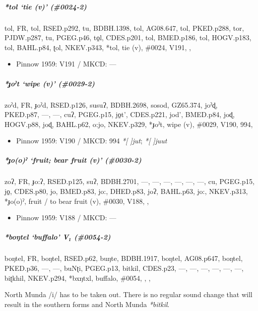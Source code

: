 \documentclass[a4paper,]{article}
\providecommand{\tightlist}{%
  \setlength{\itemsep}{0pt}\setlength{\parskip}{0pt}}
\let\oldsubparagraph\subparagraph
\renewcommand{\subparagraph}[1]{\oldsubparagraph{#1}\mbox{}}
\begin{document}
\subparagraph{\texorpdfstring{\emph{*tol} `tie (v)'
(\#0024-2)}{*tol tie (v) (\#0024-2)}}\label{tol-tie-v-0024-2}

tol, FR, tol, RSED.p292, tu, BDBH.1398, tol, AG08.647, tol, PKED.p288,
tor, PJDW.p287, tu, PGEG.p46, to̠l, CDES.p201, tol, BMED.p186, tol,
HOGV.p183, tol, BAHL.p84, ʈol, NKEV.p343, *tol, tie (v), \#0024, V191, ,

\begin{itemize}
\tightlist
\item
  Pinnow 1959: V191 / MKCD: ---
\end{itemize}

\subparagraph{\texorpdfstring{\emph{*ɟoˀt} `wipe (v)'
(\#0029-2)}{*ɟoˀt wipe (v) (\#0029-2)}}\label{ux25foux2c0t-wipe-v-0029-2}

zoˀd, FR, ɟoˀd, RSED.p126, susuʔ, BDBH.2698, sosod, GZ65.374, joˀɖ,
PKED.p87, ---, ---, cuʔ, PGEG.p15, jo̠t', CDES.p221, jod', BMED.p84, joɖ,
HOGV.p88, joɖ, BAHL.p62, o:jo, NKEV.p329, *ɟoˀt, wipe (v), \#0029, V190,
994,

\begin{itemize}
\tightlist
\item
  Pinnow 1959: V190 / MKCD: 994 \emph{*{[} {]}jut}; \emph{*{[} {]}juut}
\end{itemize}

\subparagraph{\texorpdfstring{\emph{*ɟo(o)ˀ} `fruit; bear fruit (v)'
(\#0030-2)}{*ɟo(o)ˀ fruit; bear fruit (v) (\#0030-2)}}\label{ux25fooux2c0-fruit-bear-fruit-v-0030-2}

zoʔ, FR, ɟo:ʔ, RSED.p125, suʔ, BDBH.2701, ---, ---, ---, ---, ---, ---,
cu, PGEG.p15, jo̠, CDES.p80, jo, BMED.p83, jo:, DHED.p83, joʔ, BAHL.p63,
jo:, NKEV.p313, *ɟo(o)ˀ, fruit / to bear fruit (v), \#0030, V188, ,

\begin{itemize}
\tightlist
\item
  Pinnow 1959: V188 / MKCD: ---
\end{itemize}

\subparagraph{\texorpdfstring{\emph{*boŋtel} `buffalo' V₁
(\#0054-2)}{*boŋtel buffalo V₁ (\#0054-2)}}\label{boux14btel-buffalo-v-0054-2}

boŋtel, FR, boŋtel, RSED.p62, buŋte, BDBH.1917, boŋtel, AG08.p647,
boŋtel, PKED.p36, ---, ---, buNʈi, PGEG.p13, bitkil, CDES.p23, ---, ---,
---, ---, ---, ---, biʈkhil, NKEV.p294, *bxŋtxl, buffalo, \#0054, , ,

North Munda /i/ has to be taken out. There is no regular sound change
that will result in the southern forms and North Munda \emph{*bitkil}.
\end{document}
